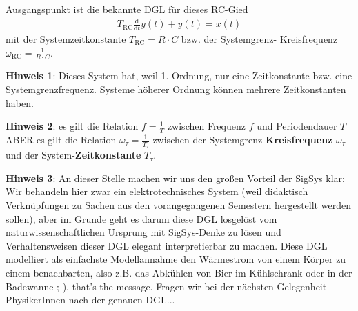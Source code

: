 \documentclass[11pt,a4paper,DIV=12]{scrartcl}
\numberwithin{equation}{section}
\numberwithin{figure}{section}
\newcommand\fsd{\mathrm{d}} %
\begin{document}
\begin{Ansatz}
Ausgangspunkt ist die bekannte DGL für dieses RC-Gied
\begin{align}
T_\mathrm{RC}\frac{\fsd}{\fsd t} y(t) + y(t) = x(t)
\end{align}
mit der Systemzeitkonstante $T_\mathrm{RC}=R \cdot C$ bzw. der Systemgrenz-
Kreisfrequenz $\omega_\mathrm{RC}=\frac{1}{R \cdot C}$.
%

\noindent\textbf{Hinweis 1}: Dieses System hat, weil 1. Ordnung, nur eine
Zeitkonstante bzw. eine Systemgrenzfrequenz.
Systeme höherer Ordnung können mehrere Zeitkonstanten haben.

\noindent\textbf{Hinweis 2}: es gilt die
Relation $f=\frac{1}{T}$ zwischen Frequenz $f$ und Periodendauer $T$ ABER
es gilt die Relation $\omega_\tau = \frac{1}{T_\tau}$ zwischen der Systemgrenz-\textbf{Kreisfrequenz}
$\omega_\tau $ und der System-\textbf{Zeitkonstante} $T_\tau $.

\noindent \textbf{Hinweis 3}:
An dieser Stelle machen wir uns den großen Vorteil der SigSys klar:
%
Wir behandeln hier zwar ein elektrotechnisches System (weil didaktisch
Verknüpfungen zu Sachen aus den vorangegangenen Semestern hergestellt werden
sollen), aber im Grunde geht es darum diese DGL losgelöst vom naturwissenschaftlichen
Ursprung mit SigSys-Denke zu lösen und Verhaltensweisen dieser DGL elegant
interpretierbar zu machen.
%
Diese DGL modelliert als einfachste Modellannahme den Wärmestrom von einem Körper
zu einem benachbarten, also z.B. das Abkühlen von Bier im Kühlschrank
oder in der Badewanne ;-), that's the message. Fragen wir bei der nächsten
Gelegenheit PhysikerInnen nach der genauen DGL...
\end{Ansatz}
\end{document}
